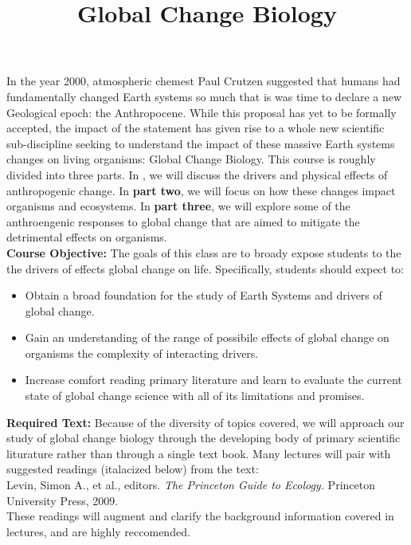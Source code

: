 \documentclass{article}\usepackage[]{graphicx}\usepackage[]{color}
\begin{document}
\title{Global Change Biology}
\date{}
\maketitle{}
\indent In the year 2000, atmospheric chemest Paul Crutzen suggested that humans had fundamentally changed Earth systems so much that is was time to declare a new Geological epoch: the Anthropocene. While this proposal has yet to be formally accepted, the impact of the statement has given rise to a whole new scientific sub-discipline seeking to understand the impact of these massive Earth systems changes on living organisms: Global Change Biology. This course is roughly divided into three parts. In , we will discuss the drivers and physical effects of anthropogenic change. In \textbf{part two}, we will focus on how these changes impact organisms and ecosystems. In \textbf{part three}, we will explore some of the anthroengenic responses to global change that are aimed to mitigate the detrimental effects on organisms. \\

\indent\textbf{Course Objective:} The goals of this class are to broady expose students to the the  drivers of effects global change on life. Specifically, students should expect to:
\begin{itemize}
\item Obtain a broad foundation for the study of Earth Systems and drivers of global change.
\item Gain an understanding of the range of possibile effects of global change on organisms the complexity of interacting drivers.
\item Increase comfort reading primary literature and learn to evaluate the current state of global change science with all of its limitations and promises.
\end{itemize}

\textbf{Required Text:} Because of the diversity of topics covered, we will approach our study of global change biology through the developing body of primary scientific liturature rather than through a single text book. Many lectures will pair with suggested readings (italacized below) from the text:\\

\indent Levin, Simon A., et al., editors. \textit{The Princeton Guide to Ecology.} Princeton University Press, 2009.\\

These readings will augment and clarify the background information covered in lectures, and are highly reccomended.\\
\end{document}
